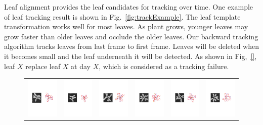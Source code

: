 Leaf alignment provides the leaf candidates for tracking over time. 
One example of leaf tracking result is shown in Fig.~\ref{fig:trackExample}. 
The leaf template transformation works well for most leaves. 
As plant grows, younger leaves may grow faster than older leaves and occlude the older leaves. 
Our backward tracking algorithm tracks leaves from last frame to first frame. 
Leaves will be deleted when it becomes small and the leaf underneath it will be detected. 
As shown in Fig,~\ref{}, leaf $X$ replace leaf $X$ at day $X$, which is considered as a tracking failure. 




\begin{figure}
\begin{centering}
\begin{tabular}{c c c c c c}
\includegraphics[width=.14\textwidth]{Figures/AlignPerformance/9_1}&
\includegraphics[width=.14\textwidth]{Figures/AlignPerformance/10_1}&
\includegraphics[width=.14\textwidth]{Figures/AlignPerformance/11_1}&
\includegraphics[width=.14\textwidth]{Figures/AlignPerformance/12_1}&
\includegraphics[width=.14\textwidth]{Figures/AlignPerformance/14_1}&
\includegraphics[width=.14\textwidth]{Figures/AlignPerformance/15_1}\\


\end{tabular}
\end{centering}
\end{figure}
